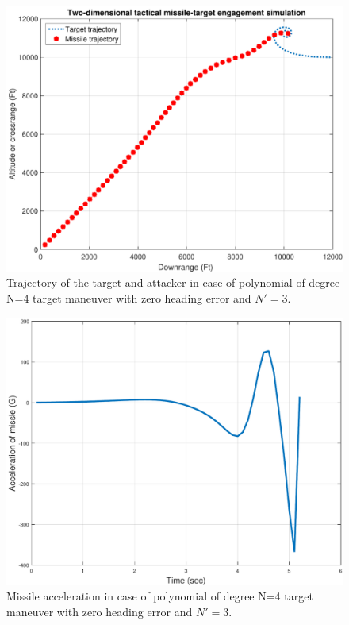 \begin{figure}[htb]
	\centering
	\includegraphics[scale = 0.35]{fig/trajectoryP4N3.pdf}
	\caption{Trajectory of the target and attacker in case of  polynomial of degree N=4 target maneuver with zero heading error and $N'=3$.}
	\label{trajectoryP4}
\end{figure}


\begin{figure}[htb]
	\centering
	\includegraphics[scale = 0.35]{fig/MissileAccelerationP4N3.pdf}
	\caption{Missile acceleration in case of  polynomial of degree N=4 target maneuver with zero heading error and $N'=3$.}
	\label{missile accelerationP4}
\end{figure}

